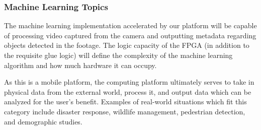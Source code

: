 
% 

\subsubsection{Machine Learning Topics}


The machine learning implementation accelerated by our platform will be capable of processing video captured from the camera and outputting metadata regarding objects detected in the footage. The logic capacity of the FPGA (in addition to the requisite glue logic) will define the complexity of the machine learning algorithm and how much hardware it can occupy. 

As this is a mobile platform, the computing platform ultimately serves to take in physical data from the external world, process it, and output data which can be analyzed for the user's benefit. Examples of real-world situations which fit this category include disaster response, wildlife management, pedestrian detection, and demographic studies.



